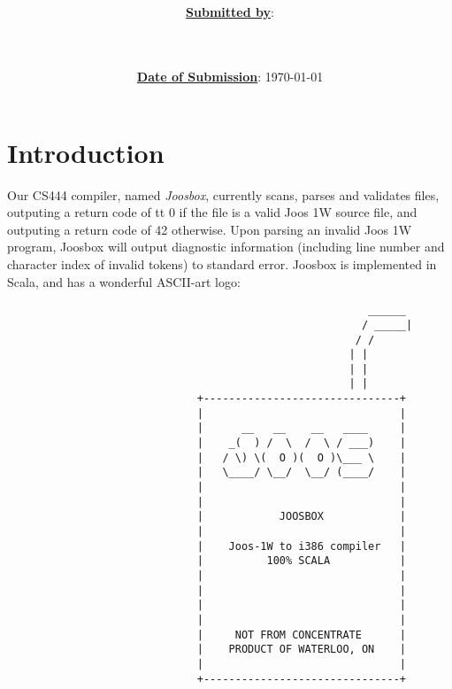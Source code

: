 \documentclass[letterpaper]{article}
\title{\course \\ \term \\ \project}
\date{\ul{\textbf{Date of Submission}}: \today}
\author{\ul{\textbf{Submitted by}}: \\ \indent \wenhao \\ \indent \chris \\ \indent \peter}
\begin{document}
  \maketitle
  \thispagestyle{empty}
  \clearpage

  \setcounter{page}{1}

  \clearpage
  \section{Introduction}

  Our CS444 compiler, named {\em Joosbox}, currently scans, parses and validates
  files, outputing a return code of {tt 0} if the file is a valid Joos 1W source
  file, and outputing a return code of 42 otherwise. Upon parsing an invalid
  Joos 1W program, Joosbox will output diagnostic information (including line
  number and character index of invalid tokens) to standard error. Joosbox is
  implemented in Scala, and has a wonderful ASCII-art logo:

  \begin{verbatim}
                                                         ______
                                                        / _____|
                                                       / /
                                                      | |
                                                      | |
                                                      | |
                              +-------------------------------+
                              |                               |
                              |      __   __    __   ____     |
                              |    _(  ) /  \  /  \ / ___)    |
                              |   / \) \(  O )(  O )\___ \    |
                              |   \____/ \__/  \__/ (____/    |
                              |                               |
                              |                               |
                              |            JOOSBOX            |
                              |                               |
                              |    Joos-1W to i386 compiler   |
                              |          100% SCALA           |
                              |                               |
                              |                               |
                              |                               |
                              |                               |
                              |     NOT FROM CONCENTRATE      |
                              |    PRODUCT OF WATERLOO, ON    |
                              |                               |
                              +-------------------------------+
  \end{verbatim}
\end{document}

